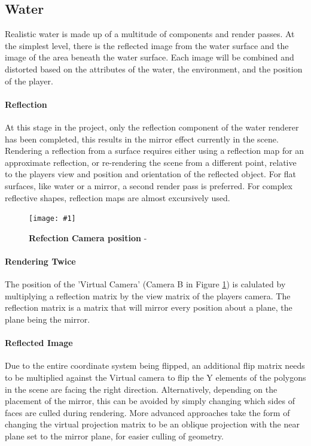 \documentclass[conference]{acmsiggraph}
\newcommand{\figuremacroW}[4]{
	\begin{figure}[h] %
		\centering
		\texttt{[image: \#1]}
		\caption[#2]{\textbf{#2} - #3}
		\label{fig:#1}
	\end{figure}
}
\begin{document}
\subsection{Water}

Realistic water is made up of a multitude of components and render passes. At the simplest level, there is the reflected image from the water surface and the image of the area beneath the water surface. Each image will be combined and distorted based on the attributes of the water, the environment, and the position of the player.

\paragraph{Reflection}
At this stage in the project, only the reflection component of the water renderer has been completed, this results in the mirror effect currently in the scene. Rendering a reflection from a surface requires either using a reflection map for an approximate reflection, or re-rendering the scene from a different point, relative to the players view and position and orientation of the reflected object.
For flat surfaces, like water or a mirror, a second render pass is preferred. For complex reflective shapes, reflection maps are almost excursively used.


\figuremacroW
{reflections}
{Refection Camera position}
{\protect\cite{Riemer}}
{1.0}

\paragraph{Rendering Twice}
The position of the 'Virtual Camera' (Camera B in Figure \ref{fig:reflections}) is calulated by multiplying a reflection matrix by the view matrix of the players camera. The reflection matrix is a matrix that will mirror every position about a plane, the plane being the mirror.

\paragraph{Reflected Image}
Due to the entire coordinate system being flipped, an additional flip matrix needs to be multiplied against the Virtual camera to flip the Y elements of the polygons in the scene are facing the right direction. Alternatively, depending on the placement of the mirror, this can be avoided by simply changing which sides of faces are culled during rendering. More advanced approaches take the form of changing the virtual projection matrix to be an oblique projection with the near plane set to the mirror plane, for easier culling of geometry.
\end{document}
